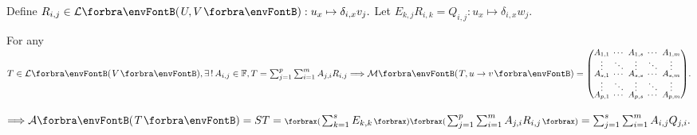 Define $R_{i,j}\in\Lm{U,V}:u_x\mapsto\delta_{i,x}v_j.$ \;Let $E_{k,j}R_{i,k}=Q_{i,j}:u_x\mapsto\delta_{i,x}w_j.$\par\vspace{-20pt}\quad
For any $T\in\Lm{V},\exists\,!\,A_{i,j}\in{}\Fbb,T=\textstyle\sum_{j=1}^p\sum_{i=1}^m A_{j,i}R_{i,j}\Longrightarrow\Mt{T,u\rightarrow v}={\small\begin{pmatrix}
		A_{1,1} &\hspace{-6pt} \cdots &\hspace{-6pt} A_{1,s} &\hspace{-6pt} \cdots &\hspace{-6pt} A_{1,m}\\[-2pt]
		\vdots  &\hspace{-6pt} \ddots &\hspace{-6pt} \vdots  &\hspace{-6pt} \ddots &\hspace{-6pt} \vdots\\[-4pt]
		A_{s,1} &\hspace{-6pt} \cdots &\hspace{-6pt} A_{s,s} &\hspace{-6pt} \cdots &\hspace{-6pt} A_{s,m}\\[-2pt]
		\vdots  &\hspace{-6pt} \ddots &\hspace{-6pt} \vdots  &\hspace{-6pt} \ddots &\hspace{-6pt} \vdots\\[-4pt]
		A_{p,1} &\hspace{-6pt} \cdots &\hspace{-6pt} A_{p,s} &\hspace{-6pt} \cdots &\hspace{-6pt} A_{p,m}
\end{pmatrix}}.$\par\vspace{-20pt}\quad
$\Longrightarrow\mA\Par{T}=ST=\textstyle\XPar{{\sum_{k=1}^sE_{k,k}}}\XPar{{\textstyle\sum_{j=1}^p\sum_{i=1}^m A_{j,i}R_{i,j}}}=\textstyle\sum_{j=1}^s\sum_{i=1}^m A_{i,j}Q_{j,i}.$\par\hspace{0pt}
